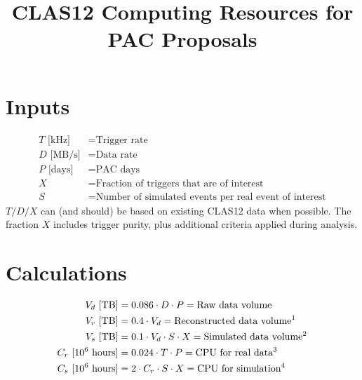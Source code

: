 \documentclass{article}
\begin{document}
\title{CLAS12 Computing Resources for PAC Proposals}
\date{}
\maketitle

\section{Inputs}
\begin{align*}
    T\text{ [kHz]}&=\text{Trigger rate}\\
    D\text{ [MB/s]}&=\text{Data rate}\\
    P\text{ [days]}&=\text{PAC days}\\
    X&=\text{Fraction of triggers that are of interest}\\
    S&=\text{Number of simulated events per real event of interest}
\end{align*}
$T/D/X$ can (and should) be based on existing CLAS12 data when possible.  The fraction $X$ includes trigger purity, plus additional criteria applied during analysis.

\section{Calculations}
\begin{minipage}{1.0\linewidth}
\begin{align*}
    V_d\text{ [TB]}&=0.086\cdot D\cdot P=\text{Raw data volume}\\
    V_r\text{ [TB]}&=0.4\cdot V_d=\text{Reconstructed data volume\footnotemark}\\
    V_s\text{ [TB]}&=0.1\cdot V_d\cdot S\cdot X=\text{Simulated data volume\footnotemark}\\
    C_r\ [10^6\text{ hours}]&=0.024\cdot T\cdot P =\text{CPU for real data\footnotemark}\\
    C_s\ [10^6\text{ hours}]&=2\cdot C_r\cdot S\cdot X =\text{CPU for simulation\footnotemark}
\end{align*}
\end{minipage}
\end{document}
